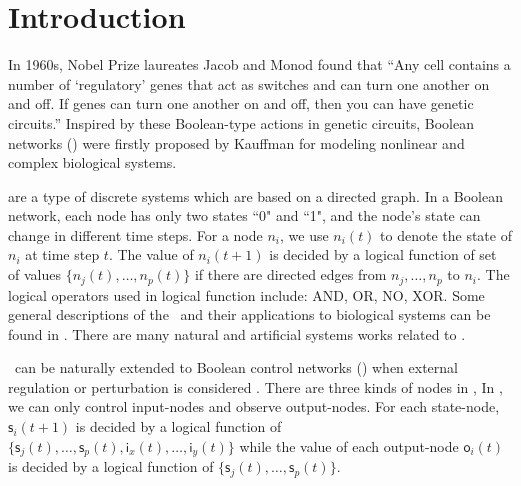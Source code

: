 \section{Introduction}
\label{sec:intro}


In 1960s, Nobel Prize laureates Jacob and Monod found that ``Any cell contains a number of `regulatory' genes that act as switches and can turn one another on and off. If genes can turn one another on and off, then you can have genetic circuits.''\cite{Jacob1961Genetic} Inspired by these Boolean-type actions in genetic circuits, Boolean networks (\BNs) were firstly proposed by Kauffman \cite{Kauffman1968Metabolic} for modeling nonlinear and complex biological systems. 

{\BNs} are a type of discrete systems which are based on a directed graph. In a Boolean network, each node has only two states ``0" and ``1", and
the node's state can change in different time steps.  For a node $n_i$, we use $n_i(t)$ to denote the state of $n_i$ at time step $t$.
%
The value of $n_i(t+1)$ is decided by a logical function of  set of  values  $\{n_j(t),\ldots,n_p(t)\}$ if  there are directed edges from $n_j,\ldots,n_p$ to $n_i$.  %
 The logical operators used in  logical function include: AND, OR, NO, XOR. %
Some general descriptions of the \BNs\ and their applications to biological systems can be found in \cite{Kauffman1968Metabolic}.
There are many natural and artificial systems works \cite{Akutsu2000Inferring, Shmulevich2002From, Faur2006Dynamical,Green2007The,Lou2010Multi} related to \BNs.
 

\BNs\ can be naturally extended to Boolean control networks (\BCNs) when external regulation or perturbation is considered \cite{Ideker2001A}. There are three kinds of nodes in \BCNs,  In \BCNs, we can only control input-nodes and observe output-nodes. 
For each state-node, $\mathsf{s}_i(t+1)$ is decided by a logical function of  $\{\mathsf{s}_j(t),\ldots,\mathsf{s}_p(t),\mathsf{i}_x(t),\ldots,\mathsf{i}_y(t)\}$  %
while the value of each output-node $\mathsf{o}_i(t)$ is decided by a logical function of   $\{\mathsf{s}_j(t),\ldots,\mathsf{s}_p(t)\}$. 

